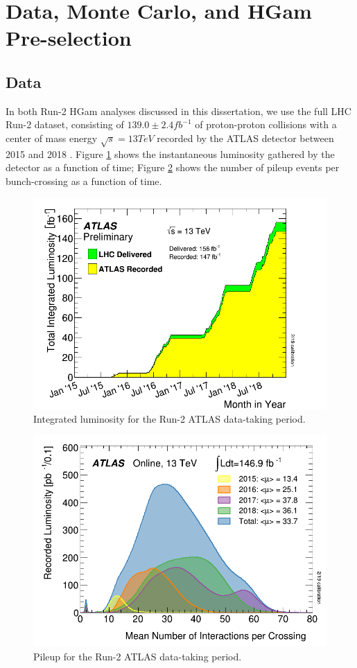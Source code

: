 \section{Data, Monte Carlo, and HGam Pre-selection} \label{sec:DataMC}

\subsection{Data} \label{sec:Data}

In both Run-2 HGam analyses discussed in this dissertation, we use the full LHC Run-2 dataset, consisting of $139.0 \pm 2.4 fb^{-1}$ of proton-proton collisions with a center of mass energy $\sqrt{s} = 13 TeV$ recorded by the ATLAS detector between 2015 and 2018 \cite{ATLAS-CONF-2019-021}. Figure \ref{fig:datalumi} shows the instantaneous luminosity gathered by the detector as a function of time; Figure \ref{fig:pileup} shows the number of pileup events per bunch-crossing as a function of time. 

\begin{figure}
\centering
\includegraphics[width=0.5\linewidth]{figures/datamc_chapter/datalumi.png}
\caption{Integrated luminosity for the Run-2 ATLAS data-taking period.}
\label{fig:datalumi}
\end{figure}

\begin{figure}
\centering
\includegraphics[width=0.5\linewidth]{figures/datamc_chapter/pileup.png}
\caption{Pileup for the Run-2 ATLAS data-taking period.}
\label{fig:pileup}
\end{figure}

